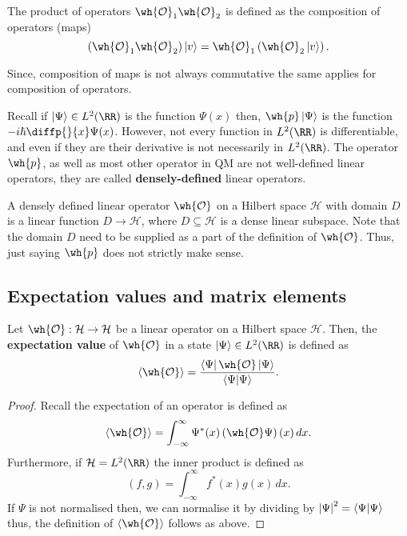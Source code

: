 \documentclass[12pt, a4paper]{article}
\begin{document}
\begin{theorem}
    The product of operators \(\wh{\mathcal{O}}_1 \wh{\mathcal{O}}_2\) is defined as the composition of operators (maps)  
    \[\left( \wh{\mathcal{O}}_1\wh{\mathcal{O}}_2 \right) \ket{v} = \wh{\mathcal{O}}_1 \left( \wh{\mathcal{O}}_2 \ket{v} \right).\]
\end{theorem}

\begin{mdremark}
    Since, composition of maps is not always commutative the same applies for composition of operators.
\end{mdremark}

\begin{mdremark}
    Recall if \(\ket{\Psi} \in L^2(\RR)\) is the function \(\Psi(x)\) then, \(\wh{p} \ket{\Psi}\) is the function \(-i\hbar \diffp{}{x} \Psi(x)\). However, not every function in \(L^2(\RR)\) is differentiable, and even if they are their derivative is not necessarily in \(L^2(\RR)\). The operator \(\wh{p}\), as well as most other operator in QM are not well-defined linear operators, they are called \textbf{densely-defined} linear operators. 

    A densely defined linear operator \(\wh{\mathcal{O}}\) on a Hilbert space \(\mathcal{H}\) with domain \(D\) is a linear function \(D \to \mathcal{H}\), where \(D \subseteq \mathcal{H}\) is a dense linear subspace. Note that the domain \(D\) need to be supplied as a part of the definition of \(\wh{\mathcal{O}}\). Thus, just saying \(\wh{p}\) does not strictly make sense. 
\end{mdremark}

\subsection{Expectation values and matrix elements}

\begin{mdthm}
    Let \(\wh{\mathcal{O}} : \mathcal{H} \to \mathcal{H}\) be a linear operator on a Hilbert space \(\mathcal{H}\). Then, the \textbf{expectation value} of \(\wh{\mathcal{O}} \) in a state \(\ket{\Psi} \in L^2(\RR)\) is defined as 
    \[\langle \wh{\mathcal{O}}  \rangle = \frac{\bra{\Psi} \wh{\mathcal{O}} \ket{\Psi}}{\bra{\Psi} \ket{\Psi}}.\]
\end{mdthm}

\begin{proof}
    Recall the expectation of an operator is defined as 
    \[\langle \wh{\mathcal{O}} \rangle = \int_{-\infty}^{\infty} \Psi^*(x) \left( \wh{\mathcal{O}}\Psi \right)(x) \, dx.\]
    Furthermore, if \(\mathcal{H} = L^2(\RR)\) the inner product is defined as 
    \[(f,g) = \int_{-\infty}^{\infty} f^*(x) g(x) \, dx.\]
    If \(\Psi\) is not normalised then, we can normalise it by dividing by \(\abs{\Psi}^2 = \bra{\Psi} \ket{\Psi}\) thus, the definition of \(\langle \wh{\mathcal{O}} \rangle\) follows as above.
\end{proof}
\end{document}
